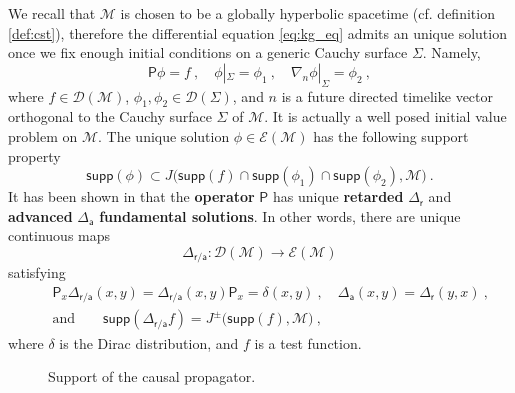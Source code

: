 \documentclass[11pt]{book}
\newcommand{\supp}{\mathsf{supp}}
\newcommand{\Dcal}{\mathcal{D}}
\newcommand{\Ecal}{\mathcal{E}}
\newcommand{\Mcal}{\mathcal{M}}
\newcommand{\Psf}{\mathsf{P}}
\newcommand{\asf}{\mathsf{a}}
\newcommand{\rsf}{\mathsf{r}}
\theoremstyle{break}
\begin{document}
We recall that $\Mcal$ is chosen to be a globally hyperbolic spacetime (cf. definition \ref{def:cst}), therefore the differential equation \eqref{eq:kg_eq} admits an unique solution once we fix enough initial conditions on a generic Cauchy surface $\Sigma$. Namely, 
%
\begin{equation}
\Psf \phi = f \ , \quad \phi|_\Sigma = \phi_1 \ , \quad \nabla_n \phi |_\Sigma = \phi_2 \ ,
\label{eq:init_val_pb}
\end{equation}
%
where $f \in \Dcal(\Mcal)$, $\phi_1, \phi_2 \in \Dcal(\Sigma)$, and $n$ is a future directed timelike vector orthogonal to the Cauchy surface $\Sigma$ of $\Mcal$. It is actually a well posed initial value problem on $\Mcal$. The unique solution $\phi \in \Ecal(\Mcal)$ has the following support property
%
\begin{equation*}
\supp(\phi) \subset J\bigg( \supp(f) \cap \supp(\phi_1) \cap \supp(\phi_2),\Mcal \bigg) \ .
\end{equation*}
%
It has been shown in \cite{baer_wave_2008} that the \textbf{operator} $\Psf$ has unique \textbf{retarded} $\Delta_\rsf$ and \textbf{advanced} $\Delta_\asf$ \textbf{fundamental solutions}. In other words, there are unique continuous maps 
%
\begin{equation*}
\Delta_{\rsf / \asf} : \Dcal(\Mcal) \to \Ecal(\Mcal)
\end{equation*}
%
satisfying 
%
\begin{eqnarray}
&& \Psf_x \Delta_{\rsf/\asf}(x,y) = \Delta_{\rsf/\asf}(x,y) \Psf_x = \delta(x,y) \ , 
\quad \Delta_{\asf}(x,y) = \Delta_{\rsf}(y,x) \ , 
\label{eq:identity_adv_ret} \\
&& \mbox{and} \qquad \supp(\Delta_{\rsf/\asf} f) = J^{\pm} \bigg(\supp(f) , \Mcal\bigg) \ , \nonumber
\end{eqnarray}
%
where $\delta$ is the Dirac distribution, and $f$ is a test function.


\begin{figure}
\begin{center}
\caption{Support of the causal propagator.}
\label{fig:supp_causal_prop}
\end{center}
\end{figure}
\end{document}
